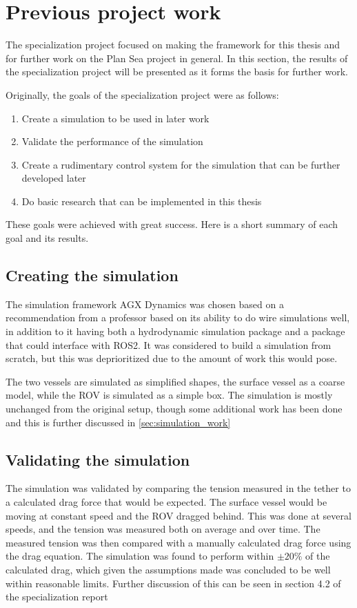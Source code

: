 \documentclass[class=article, crop=false, draft=true]{standalone}
\begin{document}
\section{Previous project work}
The specialization project focused on making the framework for this thesis and for further work on the Plan Sea project in general. In this section, the results of the specialization project will be presented as it forms the basis for further work.

Originally, the goals of the specialization project were as follows:
\begin{enumerate}
\item Create a simulation to be used in later work
\item Validate the performance of the simulation
\item Create a rudimentary control system for the simulation that can be further developed later
\item Do basic research that can be implemented in this thesis
\end{enumerate}
These goals were achieved with great success. Here is a short summary of each goal and its results.

\subsection{Creating the simulation}
The simulation framework AGX Dynamics was chosen based on a recommendation from a professor based on its ability to do wire simulations well, in addition to it having both a hydrodynamic simulation package and a package that could interface with ROS2. It was considered to build a simulation from scratch, but this was deprioritized due to the amount of work this would pose.

The two vessels are simulated as simplified shapes, the surface vessel as a coarse model, while the ROV is simulated as a simple box. The simulation is mostly unchanged from the original setup, though some additional work has been done and this is further discussed in \cref{sec:simulation_work}

\subsection{Validating the simulation}
The simulation was validated by comparing the tension measured in the tether to a calculated drag force that would be expected. The surface vessel would be moving at constant speed and the ROV dragged behind. This was done at several speeds, and the tension was measured both on average and over time. The measured tension was then compared with a manually calculated drag force using the drag equation. The simulation was found to perform within \(\pm 20\%\) of the calculated drag, which given the assumptions made was concluded to be well within reasonable limits. Further discussion of this can be seen in section 4.2 of the specialization report \cite{specialization}
\end{document}
